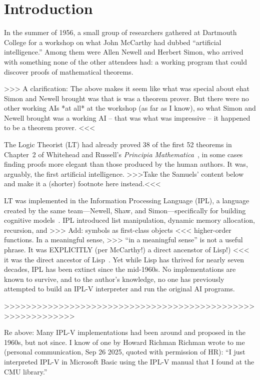 \documentclass[journal]{IEEEtran}
\begin{document}
\section{Introduction}
\label{sec:intro}

In the summer of 1956, a small group of researchers gathered at
Dartmouth College for a workshop on what John McCarthy had dubbed
``artificial intelligence.'' Among them were Allen Newell and Herbert
Simon, who arrived with something none of the other attendees had: a
working program that could discover proofs of mathematical theorems.

>>> A clarification: The above makes it seem like what was special
about ehat Simon and Newell brought was that is was a theorem prover.
But there were no other working AIs *at all* at the workshop (as far
as I know), so what Simon and Newell brought was a working AI -- that
was what was impressive -- it happened to be a theorem prover. <<<

The Logic Theorist (LT) had already proved 38 of the first 52 theorems
in Chapter~2 of Whitehead and Russell's \textit{Principia
  Mathematica}~\cite{russell1910principia}, in some cases finding
proofs more elegant than those produced by the human authors. It was,
arguably, the first artificial intelligence. >>>Take the Samuels'
content below and make it a (shorter) footnote here instead.<<<

LT was implemented in the Information Processing Language (IPL), a
language created by the same team---Newell, Shaw, and
Simon---specifically for building cognitive
models~\cite{newell1961ipl}. IPL introduced list manipulation, dynamic
memory allocation, recursion, and >>> Add: symbols as first-class
objects <<< higher-order functions. In a meaningful sense, >>> ``in a
meaningful sense'' is not a useful phrase. It was EXPLICITLY (per
McCarthy!) a direct ancenstor of Lisp!) <<< it was the direct ancestor
of Lisp~\cite{mccarthy1960lisp}. Yet while Lisp has thrived for nearly
seven decades, IPL has been extinct since the mid-1960s. No
implementations are known to survive, and to the author's knowledge,
no one has previously attempted to build an IPL-V interpreter and run
the original AI programs.

>>>>>>>>>>>>>>>>>>>>>>>>>>>>>>>>>>>>>>>>>>>>>>>>>>>>>>>>>>>

Re above: Many IPL-V implementations had been around and proposed in
the 1960s, but not since. I know of one by Howard Richman
\cite{richman1995epam} Richman wrote to me (personal communication,
Sep 26 2025, quoted with permission of HR): ``I just interpreted IPL-V
in Microsoft Basic using the IPL-V manual that I found at the CMU
library.''
\end{document}
